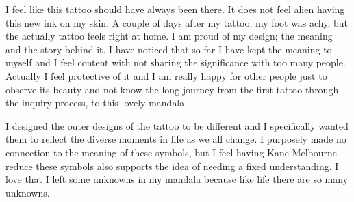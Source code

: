 I feel like this tattoo should have always been there. It does not feel alien having this new ink on my skin. A couple of days after my tattoo, my foot was achy, but the actually tattoo feels right at home. I am proud of my design; the meaning and the story behind it. I have noticed that so far I have kept the meaning to myself and I feel content with not sharing the significance with too many people. Actually I feel protective of it and I am really happy for other people just to observe its beauty and not know the long journey from the first tattoo through the inquiry process, to this lovely mandala. 
 
I designed the outer designs of the tattoo to be different and I specifically wanted them to reflect the diverse moments in life as we all change. I purposely made no connection to the meaning of these symbols, but I feel having Kane Melbourne reduce these symbols also supports the idea of needing a fixed understanding. I love that I left some unknowns in my mandala because like life there are so many unknowns. 





